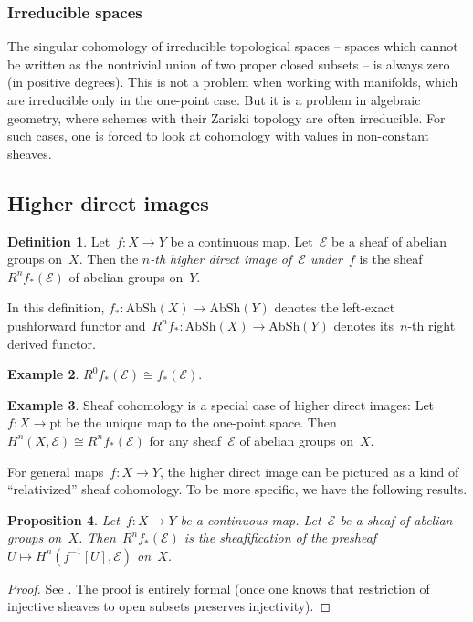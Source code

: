 \documentclass[10pt]{amsart}
\theoremstyle{definition}
\newtheorem{defn}{Definition}[section]
\newtheorem{ex}[defn]{Example}
\theoremstyle{plain}
\newtheorem{prop}[defn]{Proposition}
\theoremstyle{remark}
\newcommand{\E}{\mathcal{E}}
\newcommand{\AbSh}{\mathrm{AbSh}}
\newcommand{\pt}{\mathrm{pt}}
\newcommand{\stackhref}[1]{\href{http://stacks.math.columbia.edu/tag/#1}{#1}}
\begin{document}
\subsubsection*{Irreducible spaces} The singular cohomology of irreducible topological
spaces -- spaces which cannot be written as the nontrivial union of two proper
closed subsets -- is always zero (in positive degrees). This is not a problem
when working with manifolds, which are irreducible only in the one-point case.
But it is a problem in algebraic geometry, where schemes with their Zariski
topology are often irreducible. For such cases, one is forced to look at
cohomology with values in non-constant sheaves.


\subsection{Higher direct images}

\begin{defn}Let~$f : X \to Y$ be a continuous map. Let~$\E$ be a sheaf of
abelian groups on~$X$. Then the \emph{$n$-th higher direct image of~$\E$
under~$f$} is the sheaf~$R^n f_*(\E)$ of abelian groups on~$Y$.\end{defn}

In this definition, $f_* : \AbSh(X) \to \AbSh(Y)$ denotes the left-exact
pushforward functor and~$R^n f_* : \AbSh(X) \to \AbSh(Y)$ denotes its~$n$-th right
derived functor.

\begin{ex}$R^0 f_*(\E) \cong f_*(\E)$.\end{ex}

\begin{ex}Sheaf cohomology is a special case of higher direct images: Let~$f : X
\to \pt$ be the unique map to the one-point space. Then~$H^n(X,\E) \cong R^n
f_*(\E)$ for any sheaf~$\E$ of abelian groups on~$X$.\end{ex}

For general maps~$f : X \to Y$, the higher direct image can be pictured as a
kind of ``relativized'' sheaf cohomology. To be more specific, we have the
following results.

\begin{prop}Let~$f : X \to Y$ be a continuous map. Let~$\E$ be a sheaf of
abelian groups on~$X$. Then~$R^n f_*(\E)$ is the sheafification of the
presheaf~$U \mapsto H^n(f^{-1}[U], \E)$ on~$X$.\end{prop}

\begin{proof}See \cite[Tag~\stackhref{01E4}]{stacks-project}. The proof is
entirely formal (once one knows that restriction of injective sheaves to open
subsets preserves injectivity).
\end{proof}
\end{document}
